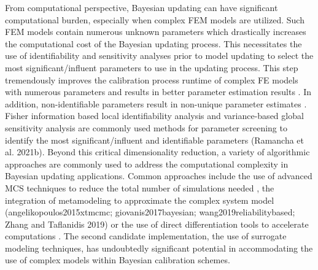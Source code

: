 From computational perspective, Bayesian updating can have significant computational burden, especially when complex FEM models are utilized. Such FEM models contain numerous unknown parameters which drastically increases the computational cost of the Bayesian updating process. This necessitates the use of identifiability and sensitivity analyses prior to model updating to select the most significant/influent parameters to use in the updating process. This step tremendously improves the calibration process runtime of complex FE models with numerous parameters and results in better parameter estimation results \citep{ramancha2021bayesianb}. In addition, non-identifiable parameters result in non-unique parameter estimates \citep{ramancha2020nonunique}. Fisher information based local identifiability analysis and variance-based global sensitivity analysis are commonly used methods for parameter screening to identify the most significant/influent and identifiable parameters (Ramancha et al. 2021b). Beyond this critical dimensionality reduction, a variety of algorithmic approaches are commonly used to address the computational complexity in Bayesian updating applications. Common approaches include the use of advanced MCS techniques to reduce the total number of simulations needed \citep{quiroz2018speeding}, the integration of metamodeling to approximate the complex system model (angelikopoulos2015xtmcmc; giovanis2017bayesian; wang2019reliabilitybased; Zhang and Taflanidis 2019) or the use of direct differentiation tools to accelerate computations \citep{astroza2017batch}. The second candidate implementation, the use of surrogate modeling techniques, has undoubtedly significant potential in accommodating the use of complex models within Bayesian calibration schemes.     

